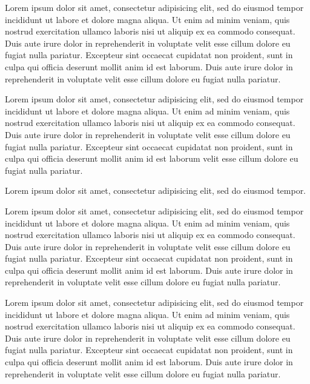 \documentclass{article}
\begin{document}
Lorem ipsum dolor sit amet, consectetur adipisicing elit, sed do eiusmod tempor incididunt ut labore et dolore magna aliqua.
Ut enim ad minim veniam, quis nostrud exercitation ullamco laboris nisi ut aliquip ex ea commodo consequat.
Duis aute irure dolor in reprehenderit in voluptate velit esse cillum dolore eu fugiat nulla pariatur.
Excepteur sint occaecat cupidatat non proident, sunt in culpa qui officia deserunt mollit anim id est laborum.
Duis aute irure dolor in reprehenderit in voluptate velit esse cillum dolore eu fugiat nulla pariatur.

Lorem ipsum dolor sit amet, consectetur adipisicing elit, sed do eiusmod tempor incididunt ut labore et dolore magna aliqua.
Ut enim ad minim veniam, quis nostrud exercitation ullamco laboris nisi ut aliquip ex ea commodo consequat.
Duis aute irure dolor in reprehenderit in voluptate velit esse cillum dolore eu fugiat nulla pariatur.
Excepteur sint occaecat cupidatat non proident, sunt in culpa qui officia deserunt mollit anim id est laborum
velit esse cillum dolore eu fugiat nulla pariatur.

Lorem ipsum dolor sit amet, consectetur adipisicing elit, sed do eiusmod tempor.

Lorem ipsum dolor sit amet, consectetur adipisicing elit, sed do eiusmod tempor incididunt ut labore et dolore magna aliqua.
Ut enim ad minim veniam, quis nostrud exercitation ullamco laboris nisi ut aliquip ex ea commodo consequat.
Duis aute irure dolor in reprehenderit in voluptate velit esse cillum dolore eu fugiat nulla pariatur.
Excepteur sint occaecat cupidatat non proident, sunt in culpa qui officia deserunt mollit anim id est laborum.
Duis aute irure dolor in reprehenderit in voluptate velit esse cillum dolore eu fugiat nulla pariatur.

Lorem ipsum dolor sit amet, consectetur adipisicing elit, sed do eiusmod tempor incididunt ut labore et dolore magna aliqua.
Ut enim ad minim veniam, quis nostrud exercitation ullamco laboris nisi ut aliquip ex ea commodo consequat.
Duis aute irure dolor in reprehenderit in voluptate velit esse cillum dolore eu fugiat nulla pariatur.
Excepteur sint occaecat cupidatat non proident, sunt in culpa qui officia deserunt mollit anim id est laborum.
Duis aute irure dolor in reprehenderit in voluptate velit esse cillum dolore eu fugiat nulla pariatur.
\end{document}
